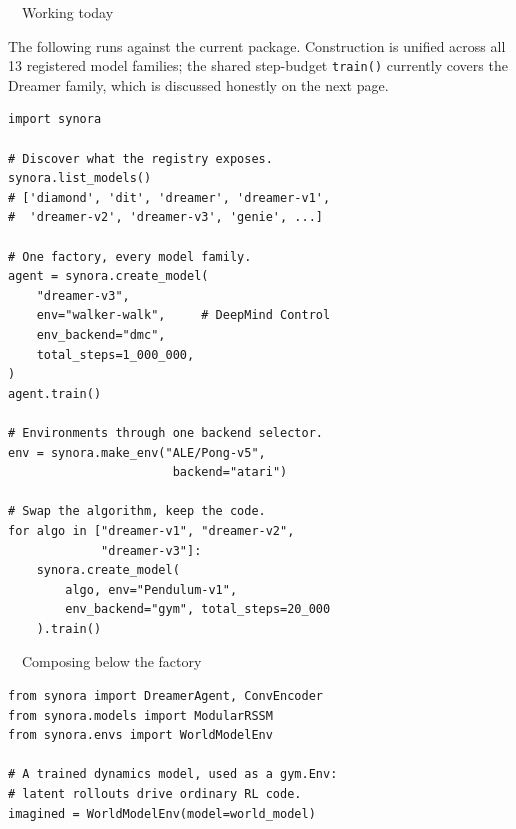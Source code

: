 \documentclass[10pt,a4paper]{article}
\newcommand{\subhead}[1]{{\displayfont\color{ink} #1}\par\vspace{1mm}}
\newcommand{\badge}[3]{\tcbox[on line,boxsep=0pt,left=3pt,right=3pt,top=1.4pt,bottom=1.4pt,
  boxrule=0pt,arc=2pt,colback=#1,coltext=#2]{\scriptsize\displayfont\MakeUppercase{#3}}}
\newcommand{\bimpl}{\badge{greensoft}{green}{implemented}}
\begin{document}
\begin{minipage}[t]{0.485\textwidth}
  \subhead{\bimpl\ \ Working today}
  {\footnotesize The following runs against the current package. Construction is unified across all
  13 registered model families; the shared step-budget \texttt{train()} currently covers the
  Dreamer family, which is discussed honestly on the next page.}
  \vspace{1.5mm}
\begin{lstlisting}
import synora

# Discover what the registry exposes.
synora.list_models()
# ['diamond', 'dit', 'dreamer', 'dreamer-v1',
#  'dreamer-v2', 'dreamer-v3', 'genie', ...]

# One factory, every model family.
agent = synora.create_model(
    "dreamer-v3",
    env="walker-walk",     # DeepMind Control
    env_backend="dmc",
    total_steps=1_000_000,
)
agent.train()

# Environments through one backend selector.
env = synora.make_env("ALE/Pong-v5",
                       backend="atari")

# Swap the algorithm, keep the code.
for algo in ["dreamer-v1", "dreamer-v2",
             "dreamer-v3"]:
    synora.create_model(
        algo, env="Pendulum-v1",
        env_backend="gym", total_steps=20_000
    ).train()
\end{lstlisting}
  \vspace{1mm}
  {\footnotesize\subhead{\bimpl\ \ Composing below the factory}}
\begin{lstlisting}
from synora import DreamerAgent, ConvEncoder
from synora.models import ModularRSSM
from synora.envs import WorldModelEnv

# A trained dynamics model, used as a gym.Env:
# latent rollouts drive ordinary RL code.
imagined = WorldModelEnv(model=world_model)
\end{lstlisting}
\end{minipage}\hfill
\end{document}
